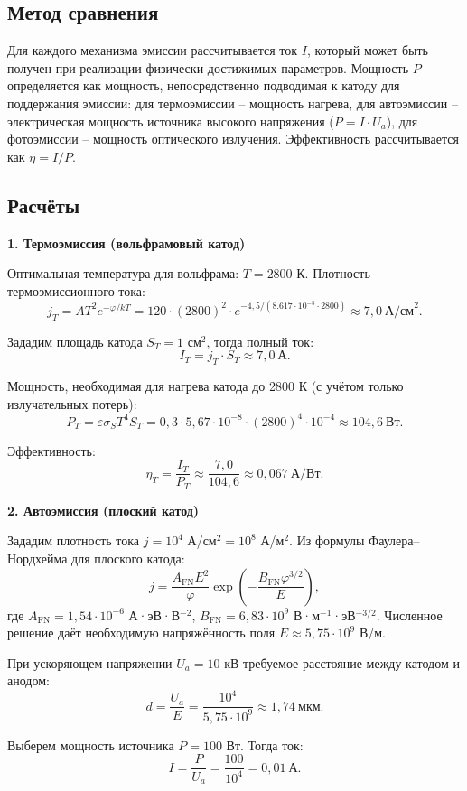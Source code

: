 \documentclass[12pt]{article}
\begin{document}
\subsection*{Метод сравнения}
Для каждого механизма эмиссии рассчитывается ток $I$, который может быть получен при реализации физически достижимых параметров. Мощность $P$ определяется как мощность, непосредственно подводимая к катоду для поддержания эмиссии: для термоэмиссии -- мощность нагрева, для автоэмиссии -- электрическая мощность источника высокого напряжения ($P = I \cdot U_a$), для фотоэмиссии -- мощность оптического излучения. Эффективность рассчитывается как $\eta = I/P$.

\subsection*{Расчёты}

\noindent\textbf{1. Термоэмиссия (вольфрамовый катод)}

Оптимальная температура для вольфрама: $T = 2800$ К. Плотность термоэмиссионного тока:
\[
j_T = A T^2 e^{-\varphi/kT} = 120 \cdot (2800)^2 \cdot e^{-4,5/(8.617\cdot10^{-5} \cdot 2800)} \approx 7,0\ \text{А/см}^2.
\]

Зададим площадь катода $S_T = 1$ см$^2$, тогда полный ток:
\[
I_T = j_T \cdot S_T \approx 7,0\ \text{А}.
\]

Мощность, необходимая для нагрева катода до 2800 К (с учётом только излучательных потерь):
\[
P_T = \varepsilon \sigma_S T^4 S_T = 0,3 \cdot 5,67\cdot10^{-8} \cdot (2800)^4 \cdot 10^{-4} \approx 104,6\ \text{Вт}.
\]

Эффективность:
\[
\eta_T = \frac{I_T}{P_T} \approx \frac{7,0}{104,6} \approx 0,067\ \text{А/Вт}.
\]

\noindent\textbf{2. Автоэмиссия (плоский катод)}

Зададим плотность тока $j = 10^4$ А/см$^2 = 10^8$ А/м$^2$. Из формулы Фаулера--Нордхейма для плоского катода:
\[
j = \frac{A_{\text{FN}} E^2}{\varphi} \exp\left(-\frac{B_{\text{FN}} \varphi^{3/2}}{E}\right),
\]
где $A_{\text{FN}} = 1,54\cdot10^{-6}$ А·эВ·В$^{-2}$, $B_{\text{FN}} = 6,83\cdot10^9$ В·м$^{-1}$·эВ$^{-3/2}$. Численное решение даёт необходимую напряжённость поля $E \approx 5,75\cdot10^9$ В/м.

При ускоряющем напряжении $U_a = 10$ кВ требуемое расстояние между катодом и анодом:
\[
d = \frac{U_a}{E} = \frac{10^4}{5,75\cdot10^9} \approx 1,74\ \text{мкм}.
\]

Выберем мощность источника $P = 100$ Вт. Тогда ток:
\[
I = \frac{P}{U_a} = \frac{100}{10^4} = 0,01\ \text{А}.
\]
\end{document}

